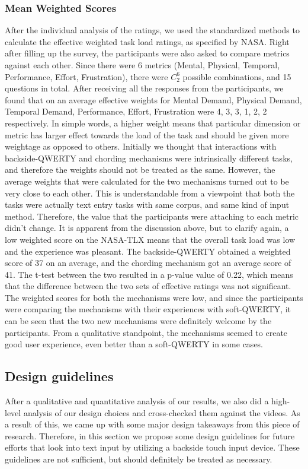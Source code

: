 \subsubsection{Mean Weighted Scores}
After the individual analysis of the ratings, we used the standardized methods to calculate the effective weighted task load ratings, as specified by NASA. Right after filling up the survey, the participants were also asked to compare metrics against each other. Since there were 6 metrics (Mental, Physical, Temporal, Performance, Effort, Frustration), there were $C_{2}^{6}$ possible combinations, and 15 questions in total. After receiving all the responses from the participants, we found that on an average effective weights for Mental Demand, Physical Demand, Temporal Demand, Performance, Effort, Frustration were 4, 3, 3, 1, 2, 2 respectively. In simple words, a higher weight means that particular dimension or metric has larger effect towards the load of the task and should be given more weightage as opposed to others. Initially we thought that interactions with backside-QWERTY and chording mechanisms were intrinsically different tasks, and therefore the weights should not be treated as the same. However, the average weights that were calculated for the two mechanisms turned out to be very close to each other. This is understandable from a viewpoint that both the tasks were actually text entry tasks with same corpus, and same kind of input method. Therefore, the value that the participants were attaching to each metric didn't change.
It is apparent from the discussion above, but to clarify again, a low weighted score on the NASA-TLX means that the overall task load was low and the experience was pleasant. The backside-QWERTY obtained a weighted score of 37 on an average, and the chording mechanism got an average score of 41. The t-test between the two resulted in a p-value value of 0.22, which means that the difference between the two sets of effective ratings was not significant. The weighted scores for both the mechanisms were low, and since the participants were comparing the mechanisms with their experiences with soft-QWERTY, it can be seen that the two new mechanisms were definitely welcome by the participants. From a qualitative standpoint, the mechanisms seemed to create good user experience, even better than a soft-QWERTY in some cases.
\subsection{Design guidelines}
After a qualitative and quantitative analysis of our results, we also did a high-level analysis of our design choices and cross-checked them against the videos. As a result of this, we came up with some major design takeaways from this piece of research. Therefore, in this section we propose some design guidelines for future efforts that look into text input by utilizing a backside touch input device. These guidelines are not sufficient, but should definitely be treated as necessary.
